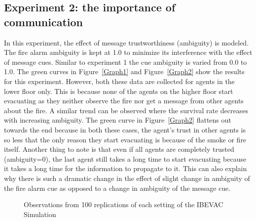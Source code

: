 
\subsection{Experiment 2:  the importance of communication}
\label{PreEvac:experiment2}

In this experiment, the effect of message trustworthiness (ambiguity) is modeled. The fire alarm ambiguity is kept at 1.0 to minimize its interference with the effect of message cues. Similar to experiment 1 the cue ambiguity is varied from 0.0 to 1.0. The green curves in Figure~\ref{Graph1} and Figure~\ref{Graph2} show the results for this experiment. However, both these data are collected for agents in the lower floor only. This is because none of the agents on the higher floor start evacuating as they neither observe the fire nor get a message from other agents about the fire. A similar trend can be observed where the survival rate decreases with increasing ambiguity. The green curve in Figure~\ref{Graph2} flattens out towards the end because in both these cases, the agent's trust in other agents is so less that the only reason they start evacuating is because of the smoke or fire itself. Another thing to note is that even if all agents are completely trusted (ambiguity=0), the last agent still takes a long time to start evacuating because it takes a long time for the information to propagate to it. This can also explain why there is such a dramatic change in the effect of slight change in ambiguity of the fire alarm cue as opposed to a change in ambiguity of the message cue.



\begin{figure}[!tb]
  \caption{Observations from 100 replications of each setting of the IBEVAC Simulation}
  \label{Exp4}
\end{figure}



